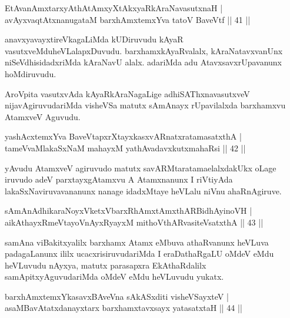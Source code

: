 \begin{shl}
EtAvanAmxtarxyAthAtAmxyXtAkxyaRkAraNavasutxnaH |\\
avAyxvaqtAtxnanugataM barxhAmx\s \s temxYva tatoV BaveVtf \hfill || 41 ||
\end{shl}

\begin{artha}
anavxyavayxtireVkagaLiMda kUDiruvudu kAyaR vasutxveMdu\break heVLalapxDuvudu. barxhamxkAyaRvalalx, kAraNatavxvanUnx niSeVdhisidadxriMda kAraNavU alalx. adariMda adu AtavxsavxrUpavanunx hoMdiruvudu.

AroVpita vasutxvAda kAyaRkAraNagaLige adhiSAThxnavasutxveV nijavAgiruvudariMda visheVSa matutx sAmAnayx rUpavilalxda barxhamxvu AtamxveV Aguvudu.
\end{artha}%


\begin{shl}
yashAcx\s \s temxYva BaveVtapxrXtayxkasxvARnatxratamasatxthA |\\
tameVvaMlakaSxNaM mahayxM yathAvadavxkutxmahaRsi \hfill || 42 ||
\end{shl}

\begin{artha}
yAvudu AtamxveV agiruvudo matutx savARMtaratama\break elalxdakUkx oLage iruvudo adeV parxtayxgAtamxvu A Atamxnanunx I riVtiyAda lakaSxNaviruvavananunx nanage idadxMtaye heVLalu niVnu ahaRnAgiruve.
\end{artha}

\begin{shl}
sAmAnAdhikaraNoyxVketxVbarxRhAmxtAmxthARBidhAyinoVH |\\
aikAthayxRmeVtayoVnAyxRyayxM mithoVthARvasiteVsatxthA \hfill || 43 ||
\end{shl}

\begin{artha}
samAna viBakitxyalilx barxhamx Atamx eMbuva athaRvanunx heVLuva padagaLanunx ililx ucacxrisiruvudariMda I eraDathaRgaLU oMdeV eMdu heVLuvudu nAyxya, matutx parasapxra EkAthaRdalilx samApitxyAguvudariMda oMdeV eMdu heVLuvudu yukatx.
\end{artha}

\begin{shl}
barxhAmx\s \s temxYkasavxBAveVna sAkASxditi visheVSayxteV |\\
asaMBavAtatxdanayxtarx barxhamxtavxsayx yatasatxtaH \hfill || 44 ||
\end{shl}

